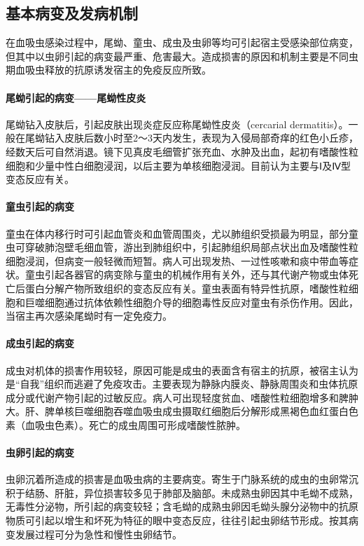 \subsection{基本病变及发病机制}

在血吸虫感染过程中，尾蚴、童虫、成虫及虫卵等均可引起宿主受感染部位病变，但其中以虫卵引起的病变最严重、危害最大。造成损害的原因和机制主要是不同虫期血吸虫释放的抗原诱发宿主的免疫反应所致。

\paragraph{尾蚴引起的病变------尾蚴性皮炎}
尾蚴钻入皮肤后，引起皮肤出现炎症反应称尾蚴性皮炎（cercarial
dermatitis）。一般在尾蚴钻入皮肤后数小时至2～3天内发生，表现为入侵局部奇痒的红色小丘疹，经数天后可自然消退。镜下见真皮毛细管扩张充血、水肿及出血，起初有嗜酸性粒细胞和少量中性白细胞浸润，以后主要为单核细胞浸润。目前认为主要与Ⅰ及Ⅳ型变态反应有关。

\paragraph{童虫引起的病变}
童虫在体内移行时可引起血管炎和血管周围炎，尤以肺组织受损最为明显，部分童虫可穿破肺泡壁毛细血管，游出到肺组织中，引起肺组织局部点状出血及嗜酸性粒细胞浸润，但病变一般轻微而短暂。病人可出现发热、一过性咳嗽和痰中带血等症状。童虫引起各器官的病变除与童虫的机械作用有关外，还与其代谢产物或虫体死亡后蛋白分解产物所致组织的变态反应有关。童虫表面有特异性抗原，嗜酸性粒细胞和巨噬细胞通过抗体依赖性细胞介导的细胞毒性反应对童虫有杀伤作用。因此，当宿主再次感染尾蚴时有一定免疫力。

\paragraph{成虫引起的病变}
成虫对机体的损害作用较轻，原因可能是成虫的表面含有宿主的抗原，被宿主认为是“自我”组织而逃避了免疫攻击。主要表现为静脉内膜炎、静脉周围炎和虫体抗原成分或代谢产物引起的过敏反应。病人可出现轻度贫血、嗜酸性粒细胞增多和脾肿大。肝、脾单核巨噬细胞吞噬血吸虫成虫摄取红细胞后分解形成黑褐色血红蛋白色素（血吸虫色素）。死亡的成虫周围可形成嗜酸性脓肿。

\paragraph{虫卵引起的病变}
虫卵沉着所造成的损害是血吸虫病的主要病变。寄生于门脉系统的成虫的虫卵常沉积于结肠、肝脏，异位损害较多见于肺部及脑部。未成熟虫卵因其中毛蚴不成熟，无毒性分泌物，所引起的病变较轻；含毛蚴的成熟虫卵因毛蚴头腺分泌物中的抗原物质可引起以增生和坏死为特征的眼中变态反应，往往引起虫卵结节形成。按其病变发展过程可分为急性和慢性虫卵结节。

